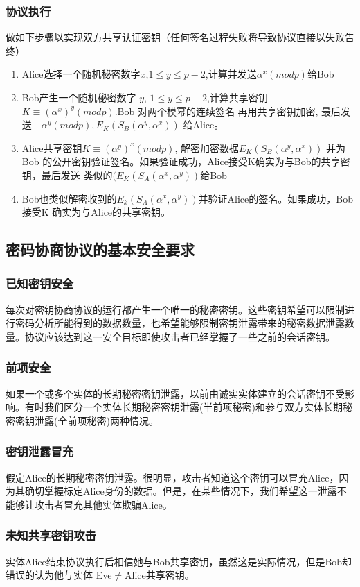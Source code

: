 \documentclass[11pt,a4paper]{article}
\begin{document}
\subsubsection{协议执行} 做如下步骤以实现双方共享认证密钥（任何签名过程失败将导致协议直接以失败告终）
\begin{enumerate}
\item Alice选择一个随机秘密数字$x$,$1\le y \le p-2$,计算并发送$\alpha^x(mod p)$给Bob

\item Bob产生一个随机秘密数字 $y$, $1\le y \le p-2$,计算共享密钥$K\equiv (\alpha^x)^y(mod p)$.Bob 对两个模幂的连续签名 再用共享密钥加密, 最后发送　$\alpha^y(mod p), E_K(S_B(\alpha^y, \alpha^x))$ 给Alice。
\item Alice共享密钥$K\equiv (\alpha^y)^x(mod p)$, 解密加密数据$E_K(S_B(\alpha^y, \alpha^x))$ 并为Bob 的公开密钥验证签名。如果验证成功，Alice接受K确实为与Bob的共享密钥，最后发送 类似的$(E_K(S_A(\alpha^x, \alpha^y))$给Bob
\item Bob也类似解密收到的$E_k(S_A(\alpha^x, \alpha^y))$并验证Alice的签名。如果成功，Bob接受K 确实为与Alice的共享密钥。
\end{enumerate}
\subsection{密码协商协议的基本安全要求}
\subsubsection{已知密钥安全} 每次对密钥协商协议的运行都产生一个唯一的秘密密钥。这些密钥希望可以限制进行密码分析所能得到的数据数量，也希望能够限制密钥泄露带来的秘密数据泄露数量。协议应该达到这一安全目标即使攻击者已经掌握了一些之前的会话密钥。
\subsubsection{前项安全} 如果一个或多个实体的长期秘密密钥泄露，以前由诚实实体建立的会话密钥不受影响。有时我们区分一个实体长期秘密密钥泄露(半前项秘密)和参与双方实体长期秘密密钥泄露(全前项秘密)两种情况。
\subsubsection{密钥泄露冒充} 假定Alice的长期秘密密钥泄露。很明显，攻击者知道这个密钥可以冒充Alice，因为其确切掌握标定Alice身份的数据。但是，在某些情况下，我们希望这一泄露不能够让攻击者冒充其他实体欺骗Alice。
\subsubsection{未知共享密钥攻击} 实体Alice结束协议执行后相信她与Bob共享密钥，虽然这是实际情况，但是Bob却错误的认为他与实体 Eve$\ne$Alice共享密钥。
\end{document}
